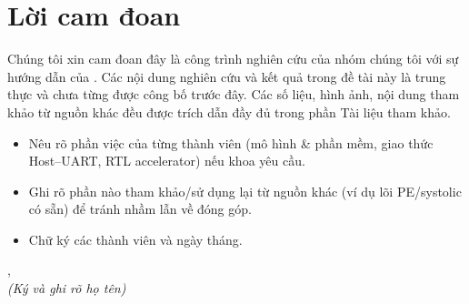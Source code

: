\chapter*{Lời cam đoan}

Chúng tôi xin cam đoan đây là công trình nghiên cứu của nhóm chúng tôi với sự hướng dẫn của
\dsgvhd. Các nội dung nghiên cứu và kết quả trong đề tài này là trung thực và chưa từng được công bố
trước đây. Các số liệu, hình ảnh, nội dung tham khảo từ nguồn khác đều được trích dẫn đầy đủ trong
phần Tài liệu tham khảo.

\begin{goiy}
  \begin{itemize}
    \item Nêu rõ phần việc của từng thành viên (mô hình \& phần mềm, giao thức Host--UART, RTL accelerator) nếu khoa yêu cầu.
    \item Ghi rõ phần nào tham khảo/sử dụng lại từ nguồn khác (ví dụ lõi PE/systolic có sẵn) để tránh nhầm lẫn về đóng góp.
    \item Chữ ký các thành viên và ngày tháng.
  \end{itemize}
\end{goiy}

\vspace{1cm}
\hfill\begin{minipage}{0.4\textwidth}\centering
  \thanhpho, \thangnam\\
  \textit{(Ký và ghi rõ họ tên)}
\end{minipage}
